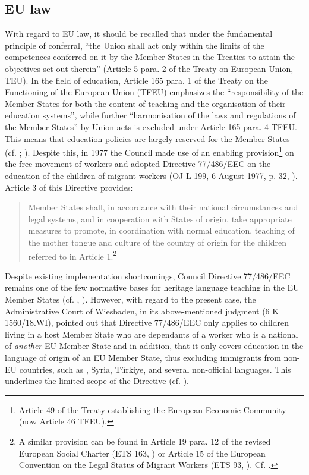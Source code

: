 \documentclass[output=paper,colorlinks,citecolor=brown]{langscibook}
\begin{document}
\subsection{EU law}\label{CH3.ss.2.2}

With regard to EU law, it should be recalled that under the fundamental principle of conferral, ``the Union shall act only within the limits of the competences conferred on it by the Member States in the Treaties to attain the objectives set out therein'' (Article 5 para. 2 of the Treaty on European Union, TEU). In the field of education, Article 165 para. 1 of the Treaty on the Functioning of the European Union (TFEU) emphasizes the ``responsibility of the Member States for both the content of teaching and the organisation of their education systems'', while further ``harmonisation of the laws and regulations of the Member States'' by Union acts is excluded under Article 165 para. 4 TFEU. This means that education policies are largely reserved for the Member States (cf. \citealt[220--222]{guliyeva2013}; \citealt[1426 et seq.]{garben2019}). 
Despite this, in 1977 the Council made use of an enabling provision\footnote{%
Article 49 of the Treaty establishing the European Economic Community (now Article 46 TFEU).} on the free movement of workers and adopted Directive 77/486/EEC on the education of the children of migrant workers (OJ L 199, 6 August 1977, p. 32, \citealt{eec1977}). Article 3 of this Directive provides: 

\begin{quote}
    Member States shall, in accordance with their national circumstances and legal systems, and in cooperation with States of origin, take appropriate measures to promote, in coordination with normal education, teaching of the mother tongue and culture of the country of origin for the children referred to in Article 1.\footnote{%
    A similar provision can be found in Article 19 para. 12 of the revised European Social Charter (ETS 163, \citealt{coe1996}) or Article 15 of the European Convention on the Legal Status of Migrant Workers (ETS 93, \citealt{coe1977}). Cf. \citealt[30--31]{hofmann_malkmus2022a}.}
\end{quote}

Despite existing implementation shortcomings, Council  Directive 77/486/EEC remains one of the few normative bases for heritage language teaching in the EU Member States (cf. \citealt{koller2012}, \citealt[221]{guliyeva2013}). However, with regard to the present case, the Administrative Court of Wiesbaden, in its above-mentioned judgment (6 K 1560/18.WI), pointed out that Directive 77/486/EEC only applies to children living in a host Member State who are dependants of a worker who is a national of \textit{another} EU Member State and in addition, that it only covers education in the language of origin of an EU Member State, thus excluding immigrants from non-EU countries, such as , Syria, Türkiye, and several non-official languages. This underlines the limited scope of the Directive (cf. \citealt{koller2012}).
\end{document}

